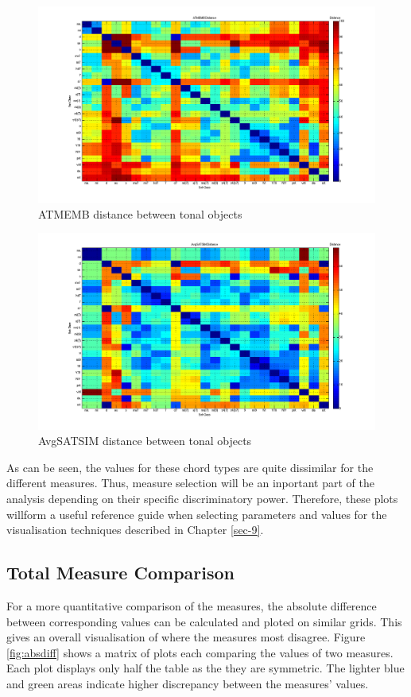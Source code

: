 \documentclass{article}
\begin{document}
\begin{figure}[htb]
\centering
\includegraphics[width=.9\linewidth]{../plots/ATMEMB_chord_comparison.png}
\caption{\label{fig:atmembchordcomp}ATMEMB distance between tonal objects}
\end{figure}
\begin{figure}[htb]
\centering
\includegraphics[width=.9\linewidth]{../plots/AvgSATSIM_chord_comparison.png}
\caption{\label{fig:avgsatsimchordcomp}AvgSATSIM distance between tonal objects}
\end{figure}

As can be seen, the values for these chord types are quite dissimilar
for the different measures. Thus, measure selection will be an
inportant part of the analysis depending on their specific
discriminatory power. Therefore, these plots willform a useful
reference guide when selecting parameters and values for the
visualisation techniques described in Chapter \ref{sec-9}.
\subsection{Total Measure Comparison}
\label{sec-7-8}

For a more quantitative comparison of the measures, the absolute
difference between corresponding values can be calculated and ploted
on similar grids. This gives an overall visualisation of where the
measures most disagree. Figure \ref{fig:absdiff} shows a matrix of
plots each comparing the values of two measures. Each plot displays
only half the table as the they are symmetric. The lighter blue and
green areas indicate higher discrepancy between the measures' values.
\end{document}
